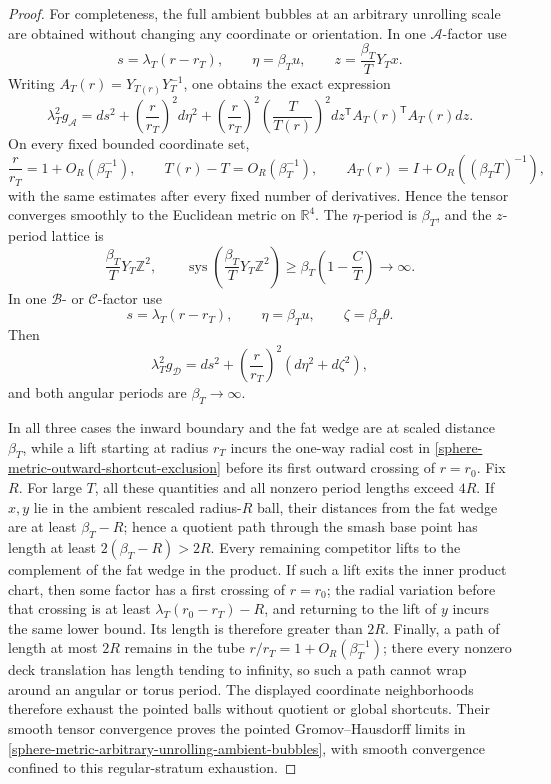 \begin{proof}
For completeness, the full ambient bubbles at an arbitrary unrolling scale
are obtained without changing any coordinate or orientation.  In one
\(\mathcal A\)-factor use
\[
 s=\lambda_T(r-r_T),\qquad
 \eta=\beta_Tu,\qquad
 z=\frac{\beta_T}{T}Y_Tx.
\]
Writing \(A_T(r)=Y_{T(r)}Y_T^{-1}\), one obtains the exact expression
\[
 \lambda_T^2g_{\mathcal A}
 =ds^2+\left(\frac r{r_T}\right)^2d\eta^2
  +\left(\frac r{r_T}\right)^2
   \left(\frac{T}{T(r)}\right)^2
   dz^{\mathsf T}A_T(r)^{\mathsf T}A_T(r)dz.
\]
On every fixed bounded coordinate set,
\[
 \frac r{r_T}=1+O_R(\beta_T^{-1}),\qquad
 T(r)-T=O_R(\beta_T^{-1}),\qquad
 A_T(r)=I+O_R((\beta_TT)^{-1}),
\]
with the same estimates after every fixed number of derivatives.  Hence
the tensor converges smoothly to the Euclidean metric on \(\mathbb R^4\).
The \(\eta\)-period is \(\beta_T\), and the \(z\)-period lattice is
\[
 \frac{\beta_T}{T}Y_T\mathbb Z^2,
 \qquad
 \operatorname{sys}\left(
   \frac{\beta_T}{T}Y_T\mathbb Z^2\right)
 \geq\beta_T\left(1-\frac CT\right)\longrightarrow\infty.
\]
In one \(\mathcal B\)- or \(\mathcal C\)-factor use
\[
 s=\lambda_T(r-r_T),\qquad
 \eta=\beta_Tu,\qquad \zeta=\beta_T\theta.
\]
Then
\[
 \lambda_T^2g_{\mathcal D}
 =ds^2+\left(\frac r{r_T}\right)^2
       (d\eta^2+d\zeta^2),
\]
and both angular periods are \(\beta_T\to\infty\).

In all three cases the inward boundary and the fat wedge are at scaled
distance \(\beta_T\), while a lift starting at radius \(r_T\) incurs the
one-way radial cost in
\eqref{sphere-metric-outward-shortcut-exclusion} before its first outward
crossing of \(r=r_0\).  Fix \(R\).  For large \(T\), all these quantities
and all nonzero period lengths exceed \(4R\).
If \(x,y\) lie in the ambient rescaled radius-\(R\) ball, their distances
from the fat wedge are at least \(\beta_T-R\); hence a quotient path through
the smash base point has length at least \(2(\beta_T-R)>2R\).  Every
remaining competitor lifts to the complement of the fat wedge in the
product.  If such a lift exits the inner product chart, then some factor
has a first crossing of \(r=r_0\); the radial variation before that crossing
is at least \(\lambda_T(r_0-r_T)-R\), and returning to the lift of \(y\)
incurs the same lower bound.  Its length is therefore greater than \(2R\).
Finally, a path of length at most \(2R\) remains in the tube
\(r/r_T=1+O_R(\beta_T^{-1})\); there every nonzero deck translation has
length tending to infinity, so such a path cannot wrap around an angular
or torus period.  The displayed coordinate neighborhoods therefore exhaust
the pointed balls without quotient or global shortcuts.
Their smooth tensor convergence proves the pointed Gromov--Hausdorff
limits in
\eqref{sphere-metric-arbitrary-unrolling-ambient-bubbles}, with smooth
convergence confined to this regular-stratum exhaustion.
\end{proof}

